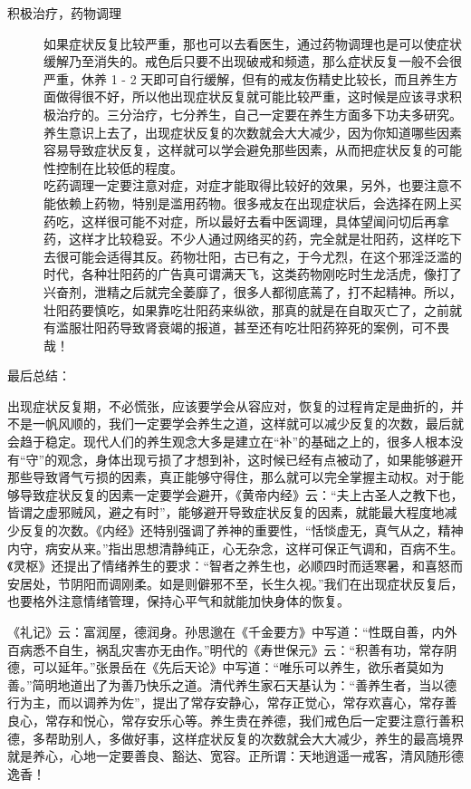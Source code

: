 \documentclass{ctexart}
\begin{document}
\begin{description}
    \item[积极治疗，药物调理] 如果症状反复比较严重，那也可以去看医生，通过药物调理也是可以使症状缓解乃至消失的。戒色后只要不出现破戒和频遗，那么症状反复一般不会很严重，休养 1 - 2 天即可自行缓解，但有的戒友伤精史比较长，而且养生方面做得很不好，所以他出现症状反复就可能比较严重，这时候是应该寻求积极治疗的。三分治疗，七分养生，自己一定要在养生方面多下功夫多研究。养生意识上去了，出现症状反复的次数就会大大减少，因为你知道哪些因素容易导致症状反复，这样就可以学会避免那些因素，从而把症状反复的可能性控制在比较低的程度。\\ 吃药调理一定要注意对症，对症才能取得比较好的效果，另外，也要注意不能依赖上药物，特别是滥用药物。很多戒友在出现症状后，会选择在网上买药吃，这样很可能不对症，所以最好去看中医调理，具体望闻问切后再拿药，这样才比较稳妥。不少人通过网络买的药，完全就是壮阳药，这样吃下去很可能会适得其反。药物壮阳，古已有之，于今尤烈，在这个邪淫泛滥的时代，各种壮阳药的广告真可谓满天飞，这类药物刚吃时生龙活虎，像打了兴奋剂，泄精之后就完全萎靡了，很多人都彻底蔫了，打不起精神。所以，壮阳药要慎吃，如果靠吃壮阳药来纵欲，那真的就是在自取灭亡了，之前就有滥服壮阳药导致肾衰竭的报道，甚至还有吃壮阳药猝死的案例，可不畏哉！
\end{description}

最后总结：

出现症状反复期，不必慌张，应该要学会从容应对，恢复的过程肯定是曲折的，并不是一帆风顺的，我们一定要学会养生之道，这样就可以减少反复的次数，最后就会趋于稳定。现代人们的养生观念大多是建立在“补”的基础之上的，很多人根本没有“守”的观念，身体出现亏损了才想到补，这时候已经有点被动了，如果能够避开那些导致肾气亏损的因素，真正能够守得住，那么就可以完全掌握主动权。对于能够导致症状反复的因素一定要学会避开，《黄帝内经》云：“夫上古圣人之教下也，皆谓之虚邪贼风，避之有时”，能够避开导致症状反复的因素，就能最大程度地减少反复的次数。《内经》还特别强调了养神的重要性，“恬惔虚无，真气从之，精神内守，病安从来。”指出思想清静纯正，心无杂念，这样可保正气调和，百病不生。《灵枢》还提出了情绪养生的要求：“智者之养生也，必顺四时而适寒暑，和喜怒而安居处，节阴阳而调刚柔。如是则僻邪不至，长生久视。”我们在出现症状反复后，也要格外注意情绪管理，保持心平气和就能加快身体的恢复。

《礼记》云：富润屋，德润身。孙思邈在《千金要方》中写道：“性既自善，内外百病悉不自生，祸乱灾害亦无由作。”明代的《寿世保元》云：“积善有功，常存阴德，可以延年。”张景岳在《先后天论》中写道：“唯乐可以养生，欲乐者莫如为善。”简明地道出了为善乃快乐之道。清代养生家石天基认为：“善养生者，当以德行为主，而以调养为佐”，提出了常存安静心，常存正觉心，常存欢喜心，常存善良心，常存和悦心，常存安乐心等。养生贵在养德，我们戒色后一定要注意行善积德，多帮助别人，多做好事，这样症状反复的次数就会大大减少，养生的最高境界就是养心，心地一定要善良、豁达、宽容。正所谓：天地逍遥一戒客，清风随形德逸香！
\end{document}
